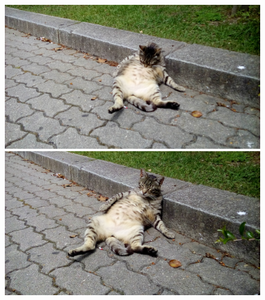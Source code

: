 \begin{figure}
\centering
\begin{minipage}{.49\textwidth}
  \centering
  \includegraphics[width=.95\linewidth]{Figures/ChapterTemplate/20160517_123603.jpg}
\end{minipage}%
\hfill
\begin{minipage}{.49\textwidth}
  \centering
  \includegraphics[width=.95\linewidth]{Figures/ChapterTemplate/20160517_123609.jpg}
\end{minipage}
\end{figure}


